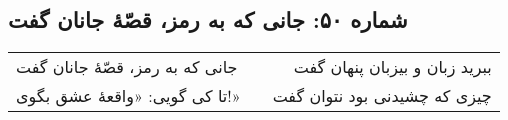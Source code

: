 \begin{center}
\section*{شماره ۵۰: جانی که به رمز، قصّۀ جانان گفت}
\label{sec:050}
\begin{longtable}{l p{0.5cm} r}
جانی که به رمز، قصّهٔ جانان گفت
&&
ببرید زبان و بیزبان پنهان گفت
\\
تا کی گویی: «واقعهٔ عشق بگوی!»
&&
چیزی که چشیدنی بود نتوان گفت
\\
\end{longtable}
\end{center}
